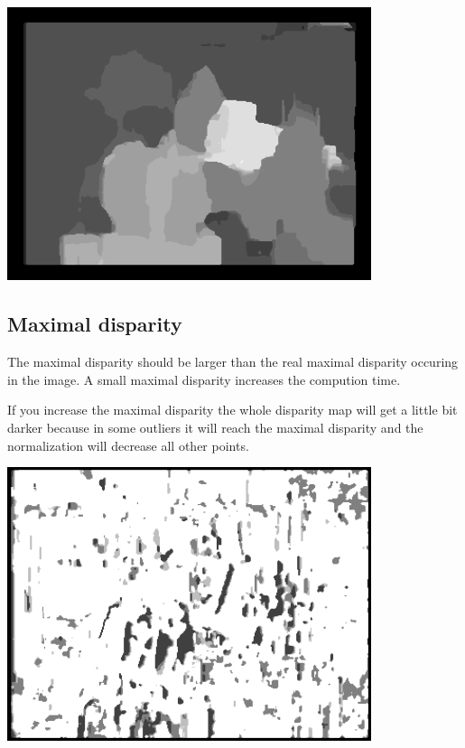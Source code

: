 \documentclass[a4paper]{scrartcl}
\begin{document}
\vspace{1cm}
\begin{minipage}{0.8\textwidth}
  \centering
  \includegraphics[width=0.8\textwidth]{disparity-r16-ssd-d20-m1.png}
  \label{fig:disparity-r16-ssd-d20-m1}
\end{minipage}


\subsection{Maximal disparity}

The maximal disparity should be larger than the real maximal disparity
occuring in the image. A small maximal disparity increases the compution time.

If you increase the maximal disparity the whole disparity map will get a
little bit darker because in some outliers it will reach the maximal disparity
and the normalization will decrease all other points.

\vspace{1cm}
\begin{minipage}{0.8\textwidth}
  \centering
  \includegraphics[width=0.8\textwidth]{disparity-r3-ssd-d4-m1.png}
  \label{fig:disparity-r3-ssd-d4-m1}
\end{minipage}
\end{document}
